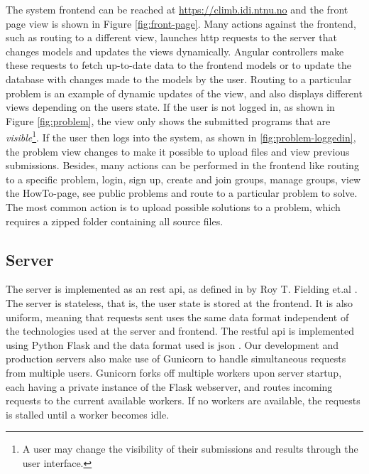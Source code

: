 The system frontend can be reached at \url{https://climb.idi.ntnu.no} and the front page view is shown in Figure \ref{fig:front-page}. Many actions against the frontend, such as routing to a different view, launches \gls{http} requests to the server that changes models and updates the views dynamically. Angular controllers make these requests to fetch up-to-date data to the frontend models or to update the database with changes made to the models by the user. Routing to a particular problem is an example of dynamic updates of the view, and also displays different views depending on the users state. If the user is not logged in, as shown in Figure \ref{fig:problem}, the view only shows the submitted programs that are \textit{visible}\footnote{A user may change the visibility of their submissions and results through the user interface.}. If the user then logs into the system, as shown in \ref{fig:problem-loggedin}, the problem view changes to make it possible to upload files and view previous submissions. Besides, many actions can be performed in the frontend like routing to a specific problem, login, sign up, create and join groups, manage groups, view the HowTo-page, see public problems and route to a particular problem to solve. The most common action is to upload possible solutions to a problem, which requires a zipped folder containing all source files. \\

\subsection{Server}
\label{subsec:cmb-arch-server}
The server is implemented as an \gls{rest} \gls{api}, as defined in by Roy T. Fielding et.al \cite{a:rtf}. The server is stateless, that is, the user state is stored at the frontend. It is also uniform, meaning that requests sent uses the same data format independent of the technologies used at the server and frontend. The \gls{rest}ful \gls{api} is implemented using Python Flask \cite{FLASK} and the data format used is \gls{json} \cite{JSON}. Our development and production servers also make use of Gunicorn \cite{GUNICORN} to handle simultaneous requests from multiple users. Gunicorn forks off multiple workers upon server startup, each having a private instance of the Flask webserver, and routes incoming requests to the current available workers. If no workers are available, the requests is stalled until a worker becomes idle. \\

